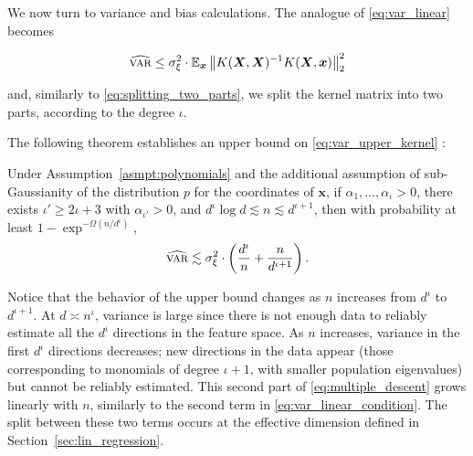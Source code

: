 We now turn to variance and bias calculations. The analogue of \eqref{eq:var_linear} becomes

\begin{align}
	\label{eq:var_upper_kernel}
	{\widehat{\textsc{var}}} \leq \sigma^2_\xi \cdot \mathbb{E}_{\boldsymbol x}\left\|K({\boldsymbol X},{\boldsymbol X})^{-1} K({\boldsymbol X},{\boldsymbol x})\right\|^2_2 
\end{align}

and, similarly to \eqref{eq:splitting_two_parts}, we split the kernel matrix into two parts, according to the degree $\iota$. 

The following theorem establishes an upper bound on \eqref{eq:var_upper_kernel} \cite{liang2020multiple}:

\begin{theorem}
	\label{thm:var_multiple_descent}
	Under Assumption~\ref{asmpt:polynomials} and the additional assumption of sub-Gaussianity of the distribution $p$ for the coordinates of ${\boldsymbol x}$,
    if $\alpha_1,\ldots,\alpha_\iota>0$, there exists $\iota'\geq 2\iota+3$
with $\alpha_{\iota'}>0$, and $d^\iota\log d \lesssim n\lesssim
d^{\iota+1}$, then with probability at least $1-\exp^{-\Omega(n/d^\iota)}$,
	\begin{align}
		\label{eq:multiple_descent}
		{\widehat{\textsc{var}}} \lesssim \sigma_\xi^2 \cdot \left(\frac{d^\iota}{n} + \frac{n}{d^{\iota+1}}\right).
	\end{align}

\end{theorem}

Notice that the behavior of the upper bound changes as $n$ increases from $d^\iota$ to $d^{\iota+1}$. At $d\asymp n^\iota$, variance is large since there is not enough data to reliably estimate all the
$d^\iota$ directions in the feature space. As $n$ increases, variance in the first $d^\iota$ directions decreases; new directions in the data appear (those corresponding to monomials of degree $\iota+1$,
with smaller population eigenvalues) but cannot be reliably estimated. This second part of \eqref{eq:multiple_descent} grows linearly with $n$, similarly to the second term in \eqref{eq:var_linear_condition}.
The split between these two terms occurs at the effective dimension defined in Section~\ref{sec:lin_regression}.


